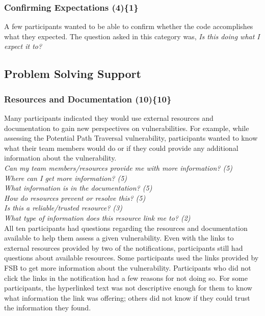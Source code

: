 \documentclass{sig-alternate}
\begin{document}

\subsubsection{\textbf{Confirming Expectations (4)\{1\}}}\label{ce}

A few participants wanted to be able to confirm whether the code accomplishes what they expected. 
The question asked in this category was, \textit{Is this doing what I expect it to?} 

\subsection{Problem Solving Support}
\vspace{-3mm}
\label{sec:results-pss}
\subsubsection{\textbf{Resources and Documentation (10)\{10\}}}\label{rd}
Many participants indicated they would use external resources and documentation to gain new perspectives on vulnerabilities.
For example, while assessing the Potential Path Traversal vulnerability, participants wanted to know what their team members would do or if they could provide any additional information about the vulnerability. 
\\

\noindent\emph{Can my team members/resources provide me with more information? (5)} \\
\emph{Where can I get more information? (5)} \\
\emph{What information is in the documentation? (5)} \\
\emph{How do resources prevent or resolve this? (5)} \\
\emph{Is this a reliable/trusted resource? (3)} \\
\emph{What type of information does this resource link me to? (2)}
\\
 
All ten participants had questions regarding the resources and documentation available to help them assess a given vulnerability. 
Even with the links to external resources provided by two of the notifications, participants still had questions about available resources. 
Some participants used the links provided by FSB to get more information about the vulnerability.
Participants who did not click the links in the notification had a few reasons for not doing so.
For some participants, the hyperlinked text was not descriptive enough for them to know what information the link was offering; others did not know if they could trust the information they found.
\end{document}
